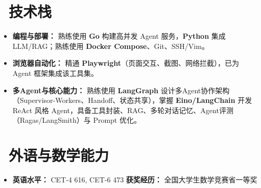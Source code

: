 \documentclass[11pt]{article}
\begin{document}
\section{\makebox[\widthof{\faCogs}][c]{\color{CVBlue}\faCogs}\ 技术栈}
\begin{itemize}[nosep]
    \item \textbf{编程与部署：} 熟练使用 \textbf{Go} 构建高并发 Agent 服务，\textbf{Python} 集成 LLM/RAG；熟练使用 \textbf{Docker Compose}、Git、SSH/Vim。
    \item \textbf{浏览器自动化：} 精通 \textbf{Playwright}（页面交互、截图、网络拦截），已为 Agent 框架集成该工具集。
    \item \textbf{多Agent与核心能力：} 熟练使用 \textbf{LangGraph} 设计多Agent协作架构（Supervisor-Workers、Handoff、状态共享），掌握 \textbf{Eino/LangChain} 开发 ReAct 风格 Agent，具备工具封装、RAG、多轮对话记忆、Agent评测（Ragas/LangSmith）与 Prompt 优化。
\end{itemize}
    
\section{\makebox[\widthof{\faInfo}][c]{\color{CVBlue}\faInfo}\ 外语与数学能力}
\begin{itemize}[parsep=0.5ex]
    \item \textbf{英语水平：} CET-4 616, CET-6 473 \quad \textbf{获奖经历：} 全国大学生数学竞赛省一等奖
\end{itemize}
\end{document}
